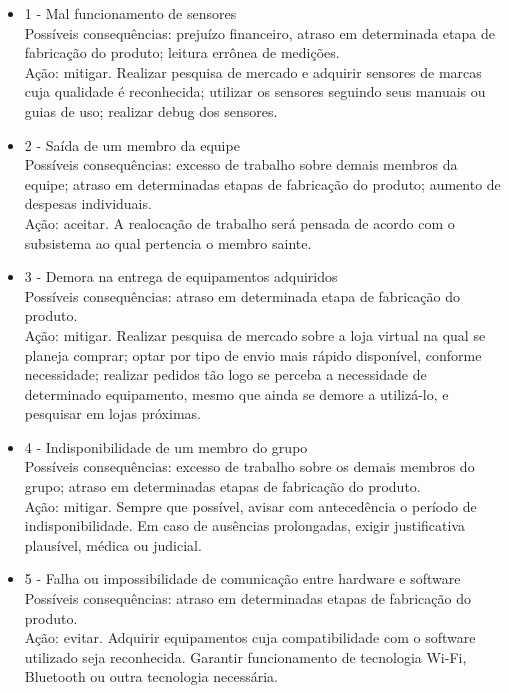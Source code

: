 \begin{itemize}
	
	\item 1 - Mal funcionamento de sensores \\
	Possíveis consequências: prejuízo financeiro, atraso em determinada etapa de fabricação do produto; leitura errônea de medições. \\
	Ação: mitigar. Realizar pesquisa de mercado e adquirir sensores de marcas cuja qualidade é reconhecida; utilizar os sensores seguindo seus manuais ou guias de uso; realizar debug dos sensores.
	
	\item 2 - Saída de um membro da equipe \\
	Possíveis consequências: excesso  de trabalho sobre demais membros da equipe; atraso em determinadas etapas de fabricação do produto; aumento de despesas individuais. \\
	Ação: aceitar. A realocação de trabalho será pensada de acordo com o subsistema ao qual pertencia o membro sainte.
	
	\item 3 - Demora na entrega de equipamentos adquiridos \\
	Possíveis consequências:  atraso em determinada etapa de fabricação do produto. \\
	Ação: mitigar. Realizar pesquisa de mercado sobre a loja virtual na qual se planeja comprar; optar por tipo de envio mais rápido disponível, conforme necessidade; realizar pedidos tão logo se perceba a necessidade de determinado equipamento, mesmo que ainda se demore a utilizá-lo, e pesquisar em lojas próximas.
	
	\item 4 - Indisponibilidade de um membro do grupo \\
	Possíveis consequências: excesso de trabalho sobre os demais membros do grupo; atraso em determinadas etapas de fabricação do produto. \\
	Ação: mitigar. Sempre que possível, avisar com antecedência o período de indisponibilidade. Em caso de ausências prolongadas, exigir justificativa plausível, médica ou judicial.
	
	\item 5 - Falha ou impossibilidade de comunicação entre hardware e software \\
	Possíveis consequências: atraso em determinadas etapas de fabricação do produto. \\
	Ação: evitar. Adquirir equipamentos cuja compatibilidade com o software utilizado seja reconhecida. Garantir funcionamento de tecnologia Wi-Fi, Bluetooth ou outra tecnologia necessária.
	

\end{itemize}
